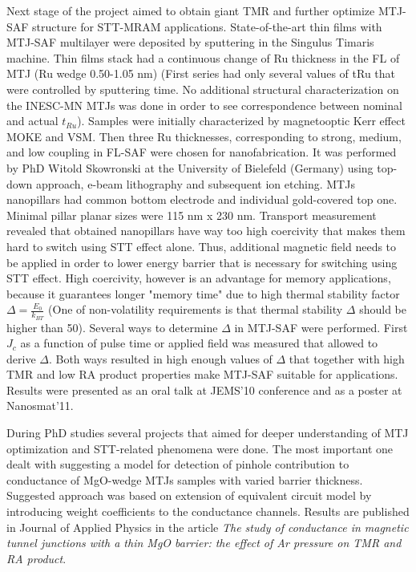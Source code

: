 Next stage of the project aimed to obtain giant TMR and further optimize MTJ-SAF structure for STT-MRAM applications.
State-of-the-art thin films with MTJ-SAF multilayer were deposited by sputtering in the Singulus Timaris machine. Thin films stack had a continuous change of Ru thickness in the FL of MTJ (Ru wedge 0.50-1.05 nm) (First series had only several values of tRu that were controlled by sputtering time. No additional structural characterization on the INESC-MN MTJs was done in order to see correspondence between nominal and actual $t_{Ru}$).
Samples were initially characterized by magnetooptic Kerr effect  MOKE and VSM. Then three Ru thicknesses, corresponding to strong, medium, and low coupling in FL-SAF were chosen for nanofabrication. It was performed by PhD Witold Skowronski at the University of Bielefeld (Germany) using top-down approach, e-beam lithography and subsequent ion etching. MTJs nanopillars had common bottom electrode and individual gold-covered top one. Minimal pillar planar sizes were 115 nm x 230 nm.
Transport measurement revealed that obtained nanopillars have way too high coercivity that makes them hard to switch using STT effect alone. Thus, additional magnetic field needs to be applied in order to lower energy barrier that is necessary for switching using STT effect. High coercivity, however is an advantage for memory applications, because it guarantees longer "memory time" due to high thermal stability factor $\Delta=\frac{E_0}{k_{BT}}$ (One of non-volatility requirements is that thermal stability $\Delta$ should be higher than 50).
Several ways to determine $\Delta$ in MTJ-SAF were performed. First $J_c$ as a function of pulse time or applied field was measured that allowed to derive $\Delta$. Both ways resulted in high enough values of $\Delta$ that together with high TMR and low RA product properties make MTJ-SAF suitable for applications.
Results were presented as an oral talk at JEMS'10 conference and as a poster at Nanosmat'11.

During PhD studies several projects that aimed for deeper understanding of MTJ optimization and STT-related phenomena were done.
The most important one dealt with suggesting a model for detection of pinhole contribution to conductance of MgO-wedge MTJs samples with varied barrier thickness. Suggested approach was based on extension of  equivalent circuit model by introducing weight coefficients to the conductance channels. Results are published in Journal of Applied Physics in the article \textit{The study of conductance in magnetic tunnel junctions with a thin MgO barrier: the effect of Ar pressure on TMR and RA product}.

